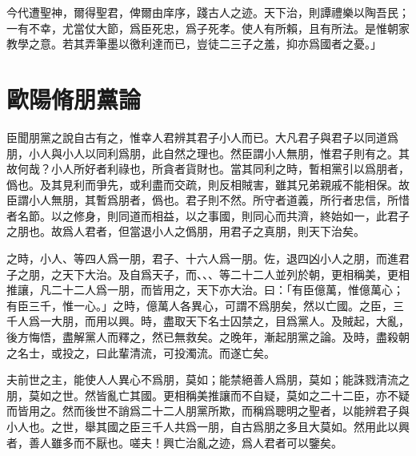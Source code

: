 今代遭聖神，爾得聖君，俾爾由庠序，踐古人之迹。天下治，則譚禮樂以陶吾民；一有不幸，尤當仗大節，爲臣死忠，爲子死孝。使人有所賴，且有所法。是惟朝家教學之意。若其弄筆墨以徼利達而已，豈徒二三子之羞，抑亦爲國者之憂。」

\theendnotes

\section[朋黨論\quad{\small 歐陽脩}]{{\normalsize 歐陽脩}\quad 朋黨論}
臣聞朋黨之說自古有之，惟幸人君辨其君子小人而已。大凡君子與君子以同道爲朋，小人與小人以同利爲朋，此自然之理也。然臣謂小人無朋，惟君子則有之。其故何哉？小人所好者利祿也，所貪者貨財也。當其同利之時，暫相黨引以爲朋者，僞也。及其見利而爭先，或利盡而交疏，則反相賊害，雖其兄弟親戚不能相保。故臣謂小人無朋，其暫爲朋者，僞也。君子則不然。所守者道義，所行者忠信，所惜者名節。以之修身，則同道而相益，以之事國，則同心而共濟，終始如一，此君子之朋也。故爲人君者，但當退小人之僞朋，用君子之真朋，則天下治矣。

之時，小人、等四人爲一朋，君子、十六人爲一朋。佐，退四凶小人之朋，而進君子之朋，之天下大治。及自爲天子，而、、、等二十二人並{列}於朝，更相稱美，更相推讓，凡二十二人爲一朋，而皆用之，天下亦大治。曰：「有臣億萬，惟億萬心；有臣三千，惟一心。」之時，億萬人各異心，可謂不爲朋矣，然以亡國。之臣，三千人爲一大朋，而用以興。時，盡取天下名士囚禁之，目爲黨人。及賊起，大亂，後方悔悟，盡解黨人而釋之，然已無救矣。之晚年，漸起朋黨之論。及時，盡殺朝之名士，或投之，曰此輩清流，可投濁流。而遂亡矣。

夫前世之主，能使人人異心不爲朋，莫如；能禁絕善人爲朋，莫如；能誅戮清流之朋，莫如之世。然皆亂亡其國。更相稱美推讓而不自疑，莫如之二十二臣，亦不疑而皆用之。然而後世不誚爲二十二人朋黨所欺，而稱爲聰明之聖者，以能辨君子與小人也。之世，舉其國之臣三千人共爲一朋，自古爲朋之多且大莫如。然用此以興者，善人雖多而不厭也。嗟{夫}！興亡治亂之迹，爲人君者可以鑒矣。

